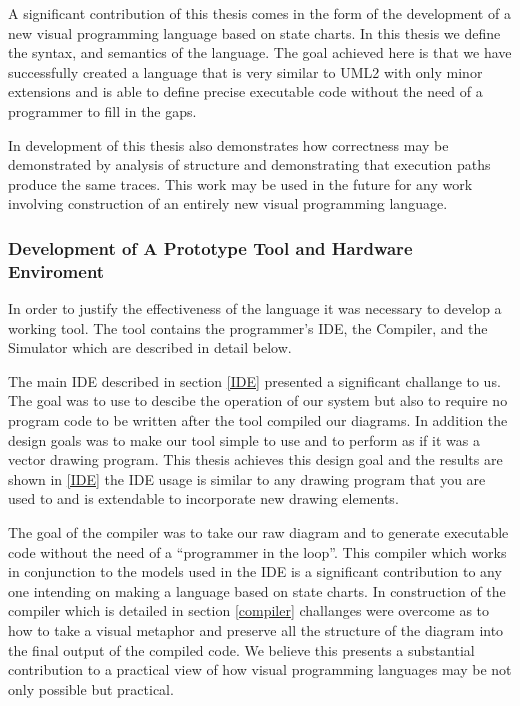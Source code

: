 A significant contribution of this thesis comes in the form of the development of \plccharts a new visual programming language based on state charts. In this thesis we define the syntax, and semantics of the language. The goal achieved here is that we have successfully created a language that is very similar to UML2 with only minor extensions and is able to define precise executable code without the need of a programmer to fill in the gaps.

In development of \plccharts this thesis also demonstrates how correctness may be demonstrated by analysis of structure and demonstrating that execution paths produce the same traces. This work may be used in the future for any work involving construction of an entirely new visual programming language.


\subsubsection{Development of A Prototype Tool and Hardware Enviroment}
In order to justify the effectiveness of the \plccharts language it was necessary to develop a working tool. The tool contains the programmer's IDE, the Compiler, and the Simulator which are described in detail below.

The main IDE described in section \ref{IDE} presented a significant challange to us. The goal was to use \plccharts to descibe the operation of our system but also to require no program code to be written after the tool compiled our diagrams. In addition the design goals was to make our tool simple to use and to perform as if it was a vector drawing program. This thesis achieves this design goal and the results are shown in \ref{IDE} the IDE usage is similar to any drawing program that you are used to and is extendable to incorporate new drawing elements.

The goal of the compiler was to take our raw diagram and to generate executable code without the need of a ``programmer in the loop''. This compiler which works in conjunction to the models used in the IDE is a significant contribution to any one intending on making a language based on state charts. In construction of the compiler which is detailed in section \ref{compiler} challanges were overcome as to how to take a visual metaphor and preserve all the structure of the diagram into the final output of the compiled code. We believe this presents a substantial contribution to a practical view of how visual programming languages may be not only possible but practical.

